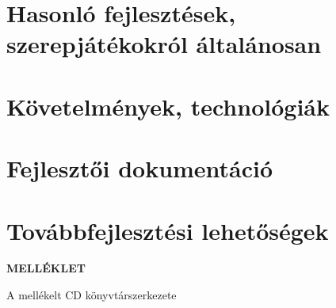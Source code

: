 \documentclass[a4paper,oneside,10pt]{report}
\begin{document}
\chapter{Hasonló fejlesztések, szerepjátékokról általánosan}
\label{bem}


\chapter{Követelmények, technológiák}
\label{kovetelmeny}


\chapter{Fejlesztői dokumentáció}
\label{devmanual}


\chapter{Továbbfejlesztési lehetőségek}
\label{tovabbfejlesztes}









\newpage

\Large
\begin{center}
	\textbf{MELLÉKLET}
\end{center}
\normalsize
\noindent
A mellékelt CD könyvtárszerkezete
\end{document}
